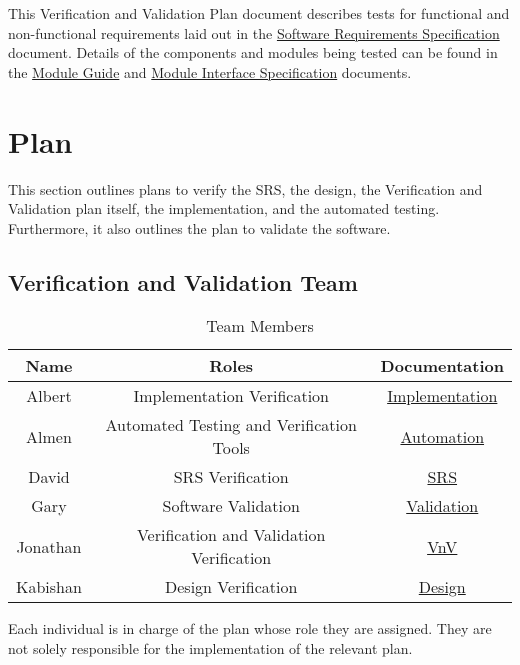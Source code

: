 \documentclass[12pt, titlepage]{article}
\begin{document}
This Verification and Validation Plan document describes tests for functional
and non-functional requirements laid out in the
\href{https://github.com/parkd-app/park-d/blob/main/docs/SRS/SRS.pdf}{Software
Requirements Specification} document. Details of the components and modules
being tested can be found in the
\href{https://github.com/parkd-app/park-d/blob/main/docs/Design/MG/MG.pdf}{Module
Guide} and
\href{https://github.com/parkd-app/park-d/blob/main/docs/Design/MIS/MIS.pdf}{Module
Interface Specification} documents.

\section{Plan}
This section outlines plans to verify the SRS, the design, the Verification and
Validation plan itself, the implementation, and the automated testing.
Furthermore, it also outlines the plan to validate the software. 


\subsection{Verification and Validation Team}
\begin{table}[hp]
\centering
\begin{tabular}{|c|c|c|}
\hline
\textbf{Name} & \textbf{Roles} & \textbf{Documentation}\\
\hline
Albert & Implementation Verification &
\hyperref[sec:implementation]{Implementation}\\
Almen & Automated Testing and Verification Tools &
\hyperref[sec:automation]{Automation}\\
David & SRS Verification & \hyperref[sec:srs]{SRS}\\
Gary & Software Validation & \hyperref[sec:validation]{Validation}\\
Jonathan & Verification and Validation Verification & \hyperref[sec:vnv]{VnV}\\
Kabishan & Design Verification & \hyperref[sec:design]{Design}\\
\hline
\end{tabular}
\caption{Team Members}
\end{table}

Each individual is in charge of the plan whose role they are assigned. They are
not solely responsible for the implementation of the relevant plan. 
\end{document}
